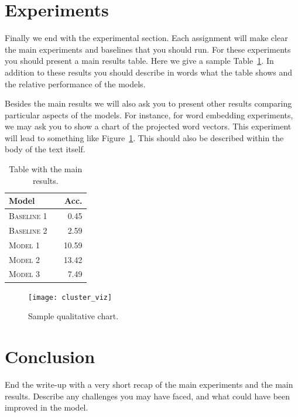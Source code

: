 \documentclass[11pt]{article}
\begin{document}
\section{Experiments}

Finally we end with the experimental section. Each assignment will make clear
the main experiments and baselines that you should run. For these experiments
you should present a main results table. Here we give a sample
Table~\ref{tab:results}. In addition to these results you should describe in
words what the table shows and the relative performance of the models.

Besides the main results we will also ask you to present other results
comparing particular aspects of the models. For instance, for word
embedding experiments, we may ask you to show a chart of the projected
word vectors. This experiment will lead to something like
Figure~\ref{fig:clusters}. This should also be described within the
body of the text itself.


\begin{table}[h]
\centering
\begin{tabular}{llr}
 \toprule
 Model &  & Acc. \\
 \midrule
 \textsc{Baseline 1} & & 0.45\\
 \textsc{Baseline 2} & & 2.59 \\
 \textsc{Model 1} & & 10.59  \\
 \textsc{Model 2} & &13.42 \\
 \textsc{Model 3} & & 7.49\\
 \bottomrule
\end{tabular}
\caption{\label{tab:results} Table with the main results.}
\end{table}


\begin{figure}
  \centering
  \texttt{[image: cluster\_viz]}
  \caption{\label{fig:clusters} Sample qualitative chart.}
\end{figure}


\section{Conclusion}

End the write-up with a very short recap of the main experiments and the main
results. Describe any challenges you may have faced, and what could have been
improved in the model.



\end{document}
